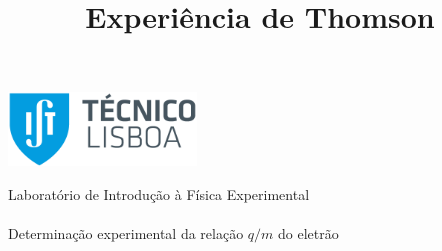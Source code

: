 \thispagestyle {empty}
\begin{center}
\begin{minipage}[c][5cm][t]{\textwidth}
\begin{center}
\includegraphics[width=5cm]{../IST_A_RGB_POS.png}
\end{center}

\end{minipage}
\begin{minipage}[t][10cm][c]{\textwidth}
\centering
{\FontMb Laboratório de Introdução à Física Experimental} \\
\paragraph{}
\centering
{\FontLb\Huge \title{Experiência de Thomson}}
\paragraph{}
{\FontMb Determinação experimental da relação $q/m$ do eletrão} \\
\paragraph{}
{}
\end{minipage}

\begin{minipage}[c][1.5cm][c]{\textwidth}
\centering
{\FontLn }
\end{minipage}

\begin{minipage}[c][1.5cm][c]{\textwidth}
\centering



\end{minipage}
\begin{minipage}[c][3cm][c]{\textwidth}
\centering
\renewcommand{\arraystretch}{1.4}

\maketitle

\vspace{-5mm}
\hline
\vspace{-3mm}
\begin{center}
\centering

\end{center}
\end{minipage}
\end{center}
